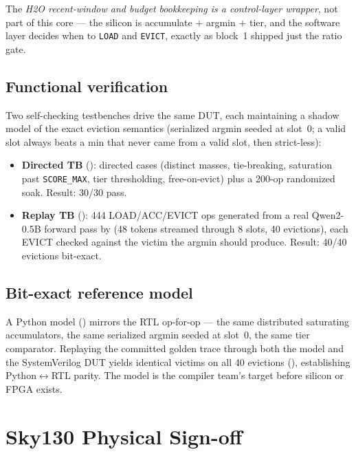 \documentclass[10pt,twocolumn]{article}
\begin{document}
The \emph{H2O recent-window and budget bookkeeping is a control-layer wrapper},
not part of this core --- the silicon is accumulate $+$ argmin $+$ tier, and the
software layer decides when to \texttt{LOAD} and \texttt{EVICT}, exactly as
block~1 shipped just the ratio gate.

\subsection{Functional verification}

Two self-checking testbenches drive the same DUT, each maintaining a shadow model
of the exact eviction semantics (serialized argmin seeded at slot~0; a valid slot always beats a min
that never came from a valid slot, then strict-less):
\begin{itemize}
  \item \textbf{Directed TB} (): directed cases
    (distinct masses, tie-breaking, saturation past \texttt{SCORE\_MAX}, tier
    thresholding, free-on-evict) plus a 200-op randomized soak. Result: 30/30 pass.
  \item \textbf{Replay TB} (): 444 LOAD/ACC/EVICT ops
    generated from a real Qwen2-0.5B forward pass by
     (48 tokens streamed through 8 slots,
    40 evictions), each EVICT checked against the victim the argmin should
    produce. Result: 40/40 evictions bit-exact.
\end{itemize}

\subsection{Bit-exact reference model}

A Python model () mirrors the RTL
op-for-op --- the same distributed saturating accumulators, the same serialized
argmin seeded at slot~0, the same tier comparator. Replaying the committed golden
trace through both the model and the SystemVerilog DUT yields identical victims on
all 40 evictions (), establishing Python$\leftrightarrow$RTL
parity. The model is the compiler team's target before silicon or FPGA exists.

\section{Sky130 Physical Sign-off}
\label{sec:sky130}
\end{document}
